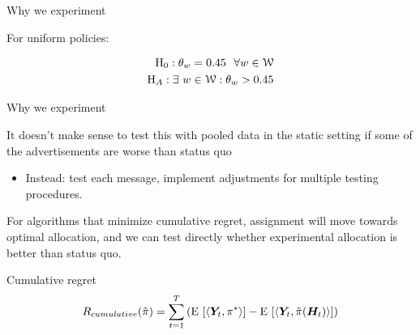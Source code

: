\documentclass[xcolor={table}]{beamer}
\begin{document}
\note{
\scriptsize \singlespacing

}
\begin{frame}[c]{Why we experiment}

For uniform policies: 

\begin{align*}
\textrm{H}_0 :  \theta_{w} = 0.45 \ \ \forall w \in {\EuScript W} \\  
\textrm{H}_A: \exists \ w \in {\EuScript W}:  \theta_{w} > 0.45 \\
\end{align*}

\end{frame}


\note{
\scriptsize \singlespacing

}
\begin{frame}[c]{Why we experiment}

\begin{wideitemize}
\item It doesn't make sense to test this with pooled data in the static setting if some of the advertisements are worse than status quo\pause
\begin{itemize}
\item[$\rightarrow$] Instead: test each message, implement  adjustments for multiple testing procedures. \pause
\end{itemize}
\item For algorithms that minimize \textcolor{Contrast1}{cumulative regret}, assignment will move towards optimal allocation, and we can test directly whether experimental allocation is better than status quo. 
\end{wideitemize}

\end{frame}


\note{
\scriptsize \singlespacing

}
\begin{frame}{Cumulative regret}
\begin{equation*}
R_{cumulative}(\tilde\pi)  = \sum_{t = 1}^T \left({\textrm E}\,\left[\langle \bm{Y}_t,\pi^* \rangle\right] - {\textrm E}\,\left[\langle \bm{Y}_t,\tilde \pi(\bm{H}_t) \rangle\right] \right)
\label{eq:regret}
\end{equation*}

\end{frame}
\end{document}
